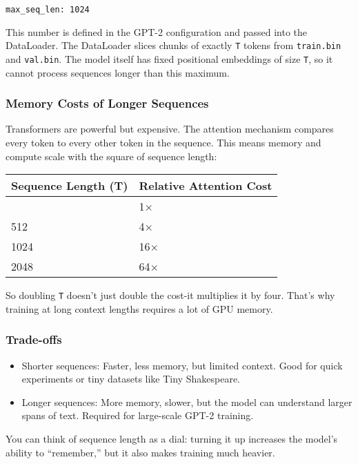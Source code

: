 \documentclass[
  letterpaper,
  DIV=11,
  numbers=noendperiod]{scrreprt}
\providecommand{\tightlist}{%
  \setlength{\itemsep}{0pt}\setlength{\parskip}{0pt}}
\begin{document}
\begin{verbatim}
max_seq_len: 1024
\end{verbatim}

This number is defined in the GPT-2 configuration and passed into the
DataLoader. The DataLoader slices chunks of exactly \texttt{T} tokens
from \texttt{train.bin} and \texttt{val.bin}. The model itself has fixed
positional embeddings of size \texttt{T}, so it cannot process sequences
longer than this maximum.

\subsubsection{Memory Costs of Longer
Sequences}\label{memory-costs-of-longer-sequences}

Transformers are powerful but expensive. The attention mechanism
compares every token to every other token in the sequence. This means
memory and compute scale with the square of sequence length:

\begin{longtable}[]{@{}ll@{}}
\toprule\noalign{}
Sequence Length (T) & Relative Attention Cost \\
\midrule\noalign{}
\endhead
\bottomrule\noalign{}
\endlastfoot
256 & 1× \\
512 & 4× \\
1024 & 16× \\
2048 & 64× \\
\end{longtable}

So doubling \texttt{T} doesn't just double the cost-it multiplies it by
four. That's why training at long context lengths requires a lot of GPU
memory.

\subsubsection{Trade-offs}\label{trade-offs}

\begin{itemize}
\tightlist
\item
  Shorter sequences: Faster, less memory, but limited context. Good for
  quick experiments or tiny datasets like Tiny Shakespeare.
\item
  Longer sequences: More memory, slower, but the model can understand
  larger spans of text. Required for large-scale GPT-2 training.
\end{itemize}

You can think of sequence length as a dial: turning it up increases the
model's ability to ``remember,'' but it also makes training much
heavier.
\end{document}

